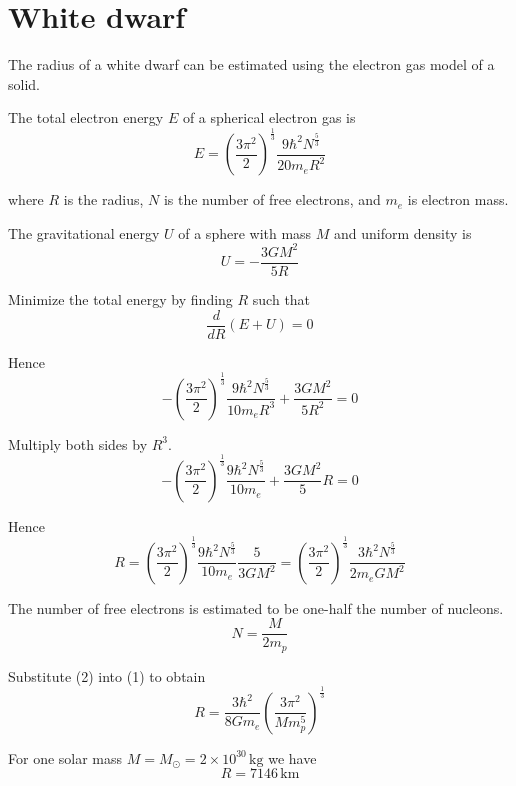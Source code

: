 


\section*{White dwarf}

The radius of a white dwarf can be estimated using the electron gas model of a solid.

\bigskip
The total electron energy $E$ of a spherical electron gas is
\begin{equation*}
E=\left(\frac{3\pi^2}{2}\right)^\frac{1}{3}
\frac{9\hbar^2N^\frac{5}{3}}{20m_eR^2}
\end{equation*}

where $R$ is the radius, $N$ is the number of free electrons, and $m_e$ is electron mass.

\bigskip
The gravitational energy $U$ of a sphere with mass $M$ and uniform density is
\begin{equation*}
U=-\frac{3GM^2}{5R}
\end{equation*}

Minimize the total energy by finding $R$ such that
\begin{equation*}
\frac{d}{dR}(E+U)=0
\end{equation*}

Hence
\begin{equation*}
-\left(\frac{3\pi^2}{2}\right)^\frac{1}{3}
\frac{9\hbar^2N^\frac{5}{3}}{10m_eR^3}+\frac{3GM^2}{5R^2}=0
\end{equation*}

Multiply both sides by $R^3$.
\begin{equation*}
-\left(\frac{3\pi^2}{2}\right)^\frac{1}{3}
\frac{9\hbar^2N^\frac{5}{3}}{10m_e}+\frac{3GM^2}{5}R=0
\end{equation*}

Hence
\begin{equation*}
R=\left(\frac{3\pi^2}{2}\right)^\frac{1}{3}
\frac{9\hbar^2N^\frac{5}{3}}{10m_e}
\frac{5}{3GM^2}
=\left(\frac{3\pi^2}{2}\right)^\frac{1}{3}
\frac{3\hbar^2N^\frac{5}{3}}{2m_eGM^2}
\tag{1}
\end{equation*}

The number of free electrons is estimated to be one-half the number of nucleons.
\begin{equation*}
N=\frac{M}{2m_p}\tag{2}
\end{equation*}

Substitute (2) into (1) to obtain
\begin{equation*}
R=\frac{3\hbar^2}{8Gm_e}\left(\frac{3\pi^2}{Mm_p^5}\right)^\frac{1}{3}\tag{3}
\end{equation*}

For one solar mass $M=M_\odot=2\times10^{30}\,\text{kg}$ we have
\begin{equation*}
R=7146\,\text{km}
\end{equation*}


